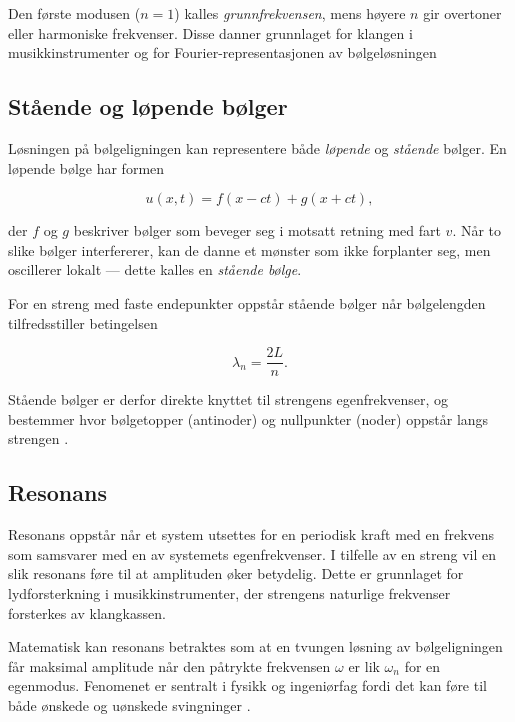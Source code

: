 Den første modusen ($n=1$) kalles \textit{grunnfrekvensen}, mens høyere $n$ gir overtoner eller harmoniske frekvenser.  
Disse danner grunnlaget for klangen i musikkinstrumenter og for Fourier-representasjonen av bølgeløsningen \parencite{physicsClassroomFundamental}

\subsection{Stående og løpende bølger}

Løsningen på bølgeligningen kan representere både \textit{løpende} og \textit{stående} bølger.  
En løpende bølge har formen

\begin{equation*}
u(x,t) = f(x - ct) + g(x + ct),
\end{equation*}

der $f$ og $g$ beskriver bølger som beveger seg i motsatt retning med fart $v$.  
Når to slike bølger interfererer, kan de danne et mønster som ikke forplanter seg, men oscillerer lokalt — dette kalles en \textit{stående bølge}.  

For en streng med faste endepunkter oppstår stående bølger når bølgelengden tilfredsstiller betingelsen

\begin{equation*}
\lambda_n = \frac{2L}{n}.
\end{equation*}

Stående bølger er derfor direkte knyttet til strengens egenfrekvenser, og bestemmer hvor bølgetopper (antinoder) og nullpunkter (noder) oppstår langs strengen \parencite{libretextsStandingWaves}.

\subsection{Resonans}

Resonans oppstår når et system utsettes for en periodisk kraft med en frekvens som samsvarer med en av systemets egenfrekvenser.  
I tilfelle av en streng vil en slik resonans føre til at amplituden øker betydelig.  
Dette er grunnlaget for lydforsterkning i musikkinstrumenter, der strengens naturlige frekvenser forsterkes av klangkassen.  

Matematisk kan resonans betraktes som at en tvungen løsning av bølgeligningen får maksimal amplitude når den påtrykte frekvensen $\omega$ er lik $\omega_n$ for en egenmodus.  
Fenomenet er sentralt i fysikk og ingeniørfag fordi det kan føre til både ønskede og uønskede svingninger \parencite{libretextsStringResonance}.

